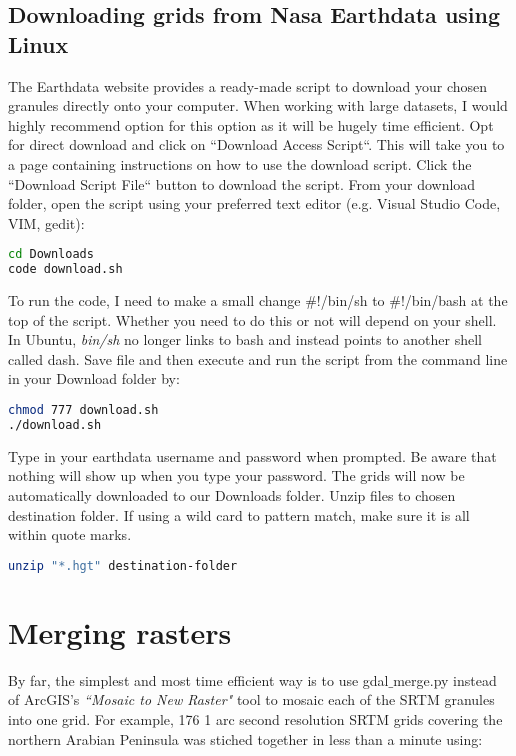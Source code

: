\subsection{Downloading grids from Nasa Earthdata using Linux}

The Earthdata website provides a ready-made script to download your chosen granules directly onto your computer. When working with large datasets, I would highly recommend option for this option as it will be hugely time efficient. Opt for direct download and click on ``Download Access Script``. This will take you to a page containing instructions on how to use the download script. Click the ``Download Script File`` button to download the script. From your download folder, open the script using your preferred text editor (e.g. Visual Studio Code, VIM, gedit):

\begin{lstlisting}[language=bash]
cd Downloads
code download.sh
\end{lstlisting}

To run the code, I need to make a small change ${\#}$!/bin/sh to ${\#}$!/bin/bash at the top of the script. Whether you need to do this or not will depend on your shell. In Ubuntu, \textit{bin/sh} no longer links to bash and instead points to another shell called dash. Save file and then execute and run the script from the command line in your Download folder by:

\begin{lstlisting}[language=bash]
chmod 777 download.sh 
./download.sh 
\end{lstlisting}

Type in your earthdata username and password when prompted. Be aware that nothing will show up when you type your password. The grids will now be automatically downloaded to our Downloads folder. Unzip files to chosen destination folder. If using a wild card to pattern match, make sure it is all within quote marks.

\begin{lstlisting}[language=bash]
unzip "*.hgt" destination-folder
\end{lstlisting}


\section{Merging rasters}

By far, the simplest and most time efficient way is to use gdal${\_}$merge.py instead of ArcGIS's \textit{``Mosaic to New Raster"} tool to mosaic each of the SRTM granules into one grid. For example, 176 1 arc second resolution SRTM grids covering the northern Arabian Peninsula was stiched together in less than a minute using:

